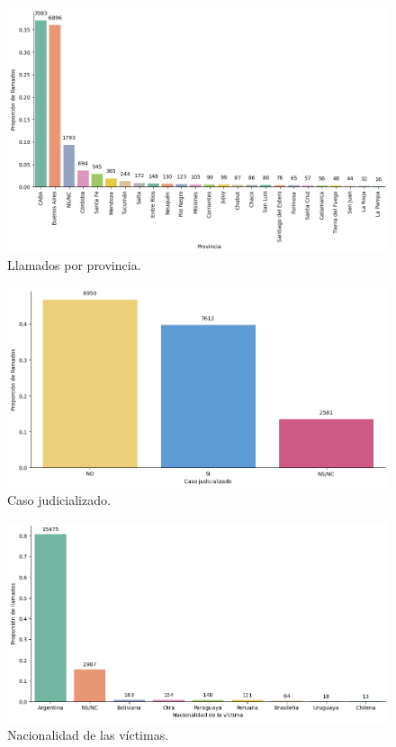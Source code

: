 \documentclass[10 pt]{article}
\begin{document}
\begin{figure}[H]
\begin{center}
\includegraphics[scale=.5]{images/latex_llamados_por_provincia.png}
\caption{Llamados por provincia.}
\label{provincia}
\end{center}
\end{figure}

\begin{figure}[H]
\begin{center}
\includegraphics[scale=.5]{images/latex_caso_judicializado.png}
\caption{Caso judicializado.}
\label{casojudicializado}
\end{center}
\end{figure}


\begin{figure}[H]
\begin{center}
\includegraphics[scale=.5]{images/latex_nacionalidad_victima.png}
\caption{Nacionalidad de las víctimas.}
\label{nacionalidad}
\end{center}
\end{figure}
\end{document}
